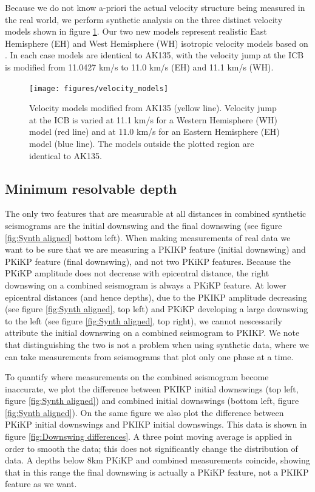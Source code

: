 \documentclass[11pt,a4paper]{article}
\begin{document}
Because we do not know a-priori the actual velocity structure being measured in the real world, we perform synthetic analysis on the three distinct velocity models shown in figure \ref{fig:Velocity models}. Our two new models represent realistic East Hemisphere (EH) and West Hemisphere (WH) isotropic velocity models based on \cite{Waszek2011a}. In each case models are identical to AK135, with the velocity jump at the ICB is modified from 11.0427 km/s to 11.0 km/s (EH) and 11.1 km/s (WH).

\begin{figure}
	\centering
	\texttt{[image: figures/velocity\_models]}
	\caption{Velocity models modified from AK135 (yellow line). Velocity jump at the ICB is varied at 11.1 km/s for a Western Hemisphere (WH) model (red line) and at 11.0 km/s for an Eastern Hemisphere (EH) model (blue line). The models outside the plotted region are identical to AK135.}
	\label{fig:Velocity models}
\end{figure}

\subsection{Minimum resolvable depth}
The only two features that are measurable at all distances in combined synthetic seismograms are the initial downswing and the final downswing (see figure \ref{fig:Synth aligned} bottom left). When making measurements of real data we want to be sure that we are measuring a PKIKP feature (initial downswing) and PKiKP feature (final downswing), and not two PKiKP features. Because the PKiKP amplitude does not decrease with epicentral distance, the right downswing on a combined seismogram is always a PKiKP feature. At lower epicentral distances (and hence depths), due to the PKIKP amplitude decreasing (see figure \ref{fig:Synth aligned}, top left) and PKiKP developing a large downswing to the left (see figure \ref{fig:Synth aligned}, top right), we cannot nescessarily attribute the initial downswing on a combined seismogram to PKIKP. We note that distinguishing the two is not a problem when using synthetic data, where we can take measurements from seismograms that plot only one phase at a time.

To quantify where measurements on the combined seismogram become inaccurate, we plot the difference between PKIKP initial downswings (top left, figure \ref{fig:Synth aligned}) and combined initial downswings (bottom left, figure \ref{fig:Synth aligned}). On the same figure we also plot the difference between PKiKP initial downswings and PKIKP initial downswings. This data is shown in figure \ref{fig:Downswing differences}. A three point moving average is applied in order to smooth the data; this does not significantly change the distribution of data. A depths below 8km PKiKP and combined measurements coincide, showing that in this range the final downswing is actually a PKiKP feature, not a PKIKP feature as we want.
\end{document}
